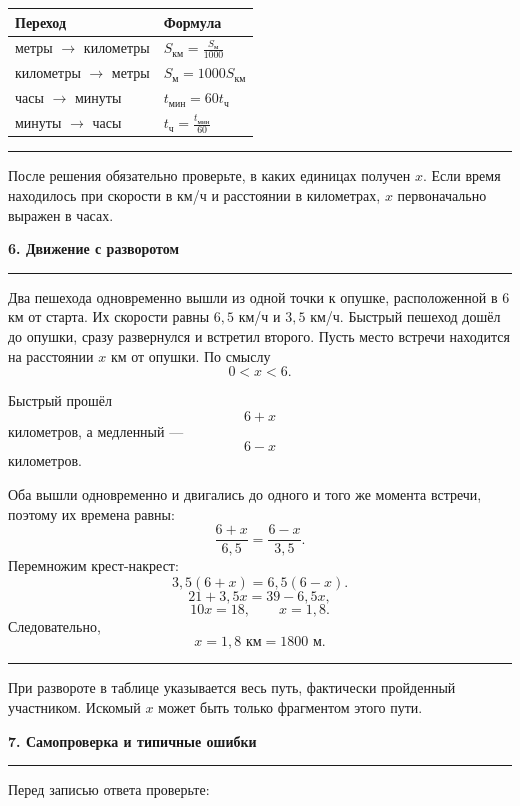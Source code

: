 \documentclass[a4paper,12pt]{article}
\newcommand{\sectiontitle}[1]{%
  \Needspace{6\baselineskip}%
  \vspace{0.25em}%
  {\Large\bfseries\color{darkaccent}#1}\par
  \vspace{0.25em}%
  \textcolor{rulegray}{\rule{\linewidth}{0.6pt}}%
  \vspace{0.35em}%
}
\newcommand{\important}[1]{%
  \par\vspace{0.2em}%
  \noindent
  \textcolor{accent}{\rule{2.4pt}{\baselineskip}}%
  \hspace{0.65em}%
  \begin{minipage}[t]{0.94\linewidth}
  #1
  \end{minipage}%
  \par\vspace{0.3em}%
}
\begin{document}
\begin{center}
\renewcommand{\arraystretch}{1.35}
\begin{tabularx}{0.88\linewidth}{@{}lX@{}}
\toprule
Переход & Формула\\
\midrule
метры \(\to\) километры & \(\displaystyle S_{\text{км}}=\frac{S_{\text{м}}}{1000}\)\\[2mm]
километры \(\to\) метры & \(\displaystyle S_{\text{м}}=1000S_{\text{км}}\)\\[2mm]
часы \(\to\) минуты & \(\displaystyle t_{\text{мин}}=60t_{\text{ч}}\)\\[2mm]
минуты \(\to\) часы & \(\displaystyle t_{\text{ч}}=\frac{t_{\text{мин}}}{60}\)\\
\bottomrule
\end{tabularx}
\end{center}

\important{
После решения обязательно проверьте, в каких единицах получен \(x\).
Если время находилось при скорости в км/ч и расстоянии в километрах, \(x\) первоначально выражен в часах.
}

\sectiontitle{6. Движение с разворотом}

Два пешехода одновременно вышли из одной точки к опушке,
расположенной в \(6\) км от старта. Их скорости равны \(6{,}5\) км/ч и \(3{,}5\) км/ч.
Быстрый пешеход дошёл до опушки, сразу развернулся и встретил второго.
Пусть место встречи находится на расстоянии \(x\) км от опушки. По смыслу
\[
0<x<6.
\]

Быстрый прошёл
\[
6+x
\]
километров, а медленный ---
\[
6-x
\]
километров.

Оба вышли одновременно и двигались до одного и того же момента встречи, поэтому их времена равны:
\[
\frac{6+x}{6{,}5}=\frac{6-x}{3{,}5}.
\]
Перемножим крест-накрест:
\[
3{,}5(6+x)=6{,}5(6-x).
\]
\[
21+3{,}5x=39-6{,}5x,
\]
\[
10x=18,
\qquad
x=1{,}8.
\]
Следовательно,
\[
\boxed{x=1{,}8\text{ км}=1800\text{ м}}.
\]

\important{
При развороте в таблице указывается весь путь, фактически пройденный участником.
Искомый \(x\) может быть только фрагментом этого пути.
}

\sectiontitle{7. Самопроверка и типичные ошибки}

Перед записью ответа проверьте:
\end{document}

